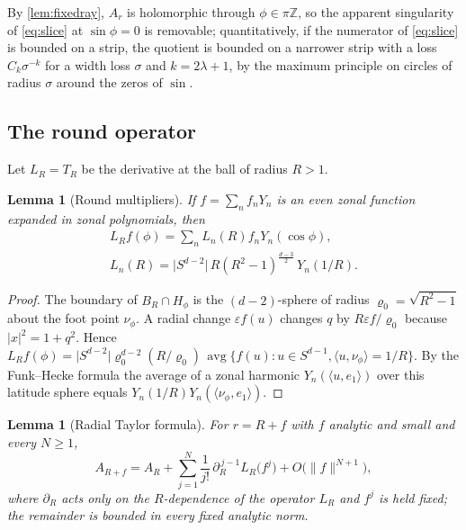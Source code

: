 \documentclass[11pt]{amsart}
\numberwithin{equation}{section}
\newtheorem{lemma}[theorem]{Lemma}
\theoremstyle{definition}
\theoremstyle{remark}
\newcommand{\Z}{\mathbb{Z}}
\newcommand{\eps}{\varepsilon}
\newcommand{\abs}[1]{\lvert #1\rvert}
\newcommand{\norm}[1]{\lVert #1\rVert}
\begin{document}
By \cref{lem:fixedray}, $A_r$ is holomorphic through $\phi\in\pi\Z$, so the apparent singularity of \eqref{eq:slice} at $\sin\phi=0$ is removable; quantitatively, if the numerator of \eqref{eq:slice} is bounded on a strip, the quotient is bounded on a narrower strip with a loss $C_k\sigma^{-k}$ for a width loss $\sigma$ and $k=2\lambda+1$, by the maximum principle on circles of radius $\sigma$ around the zeros of $\sin$.

\subsection{The round operator}
Let $L_R=T_{R}$ be the derivative at the ball of radius $R>1$.

\begin{lemma}[Round multipliers]\label{lem:round}
If $f=\sum_nf_nY_n$ is an even zonal function expanded in zonal polynomials, then
\begin{equation}\label{eq:Ln}
\begin{gathered}
L_Rf(\phi)=\sum_nL_n(R)f_nY_n(\cos\phi),\\
L_n(R)=\abs{S^{d-2}}\,R(R^2-1)^{\frac{d-3}2}\,Y_n(1/R).
\end{gathered}
\end{equation}
\end{lemma}

\begin{proof}
The boundary of $B_R\cap H_\phi$ is the $(d-2)$-sphere of radius $\varrho_0=\sqrt{R^2-1}$ about the foot point $\nu_\phi$. A radial change $\eps f(u)$ changes $q$ by $R\eps f/\varrho_0$ because $\abs x^2=1+q^2$. Hence $L_Rf(\phi)=\abs{S^{d-2}}\varrho_0^{d-2}(R/\varrho_0)\,\operatorname{avg}\{f(u):u\in S^{d-1},\langle u,\nu_\phi\rangle=1/R\}$. By the Funk--Hecke formula the average of a zonal harmonic $Y_n(\langle u,e_1\rangle)$ over this latitude sphere equals $Y_n(1/R)Y_n(\langle\nu_\phi,e_1\rangle)$.
\end{proof}

\begin{lemma}[Radial Taylor formula]\label{lem:taylor}
For $r=R+f$ with $f$ analytic and small and every $N\ge1$,
\begin{equation}\label{eq:taylor}
A_{R+f}=A_R+\sum_{j=1}^N\frac1{j!}\,\partial_R^{\,j-1}L_R\bigl(f^j\bigr)+O\bigl(\norm f^{N+1}\bigr),
\end{equation}
where $\partial_R$ acts only on the $R$-dependence of the operator $L_R$ and $f^j$ is held fixed; the remainder is bounded in every fixed analytic norm.
\end{lemma}
\end{document}
